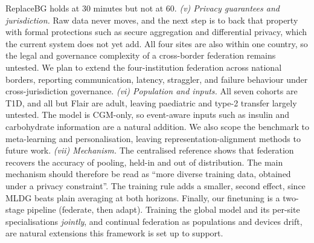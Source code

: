 \documentclass[10pt,letterpaper]{article}
\begin{document}
ReplaceBG holds at 30 minutes but not at 60.
\emph{(v) Privacy guarantees and jurisdiction.} Raw data never moves, and the
next step is to back that property with formal protections such as secure
aggregation and differential privacy, which the current system does not yet
add. All four sites are also within one country, so the legal and governance
complexity of a cross-border federation remains untested. We plan to extend the
four-institution federation across national borders, reporting communication,
latency, straggler, and failure behaviour under cross-jurisdiction governance.
\emph{(vi) Population and inputs.} All seven cohorts are T1D, and all but
Flair are adult, leaving paediatric and type-2 transfer largely untested. The model is CGM-only, so event-aware
inputs such as insulin and carbohydrate information are a natural addition. We
also scope the benchmark to meta-learning and personalisation, leaving
representation-alignment methods to future work.
\emph{(vii) Mechanism.} The centralised reference shows that federation
recovers the accuracy of pooling, held-in and out of distribution. The main
mechanism should therefore be read as ``more diverse training data, obtained
under a privacy constraint''. The training rule adds a smaller, second
effect, since MLDG beats plain averaging at both horizons.
Finally, our finetuning is a two-stage pipeline (federate, then adapt).
Training the global model and its per-site specialisations \emph{jointly}, and
continual federation as populations and devices drift, are natural extensions
this framework is set up to support.



\end{document}
